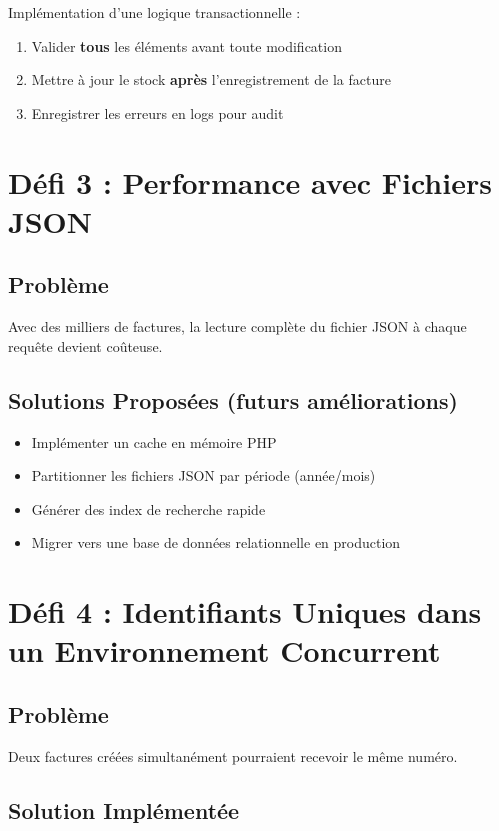 \documentclass[12pt,a4paper]{report}
\begin{document}
Implémentation d'une logique transactionnelle :

\begin{enumerate}
    \item Valider \textbf{tous} les éléments avant toute modification
    \item Mettre à jour le stock \textbf{après} l'enregistrement de la facture
    \item Enregistrer les erreurs en logs pour audit
\end{enumerate}

\section{Défi 3 : Performance avec Fichiers JSON}

\subsection{Problème}

Avec des milliers de factures, la lecture complète du fichier JSON à chaque requête devient coûteuse.

\subsection{Solutions Proposées (futurs améliorations)}

\begin{itemize}
    \item Implémenter un cache en mémoire PHP
    \item Partitionner les fichiers JSON par période (année/mois)
    \item Générer des index de recherche rapide
    \item Migrer vers une base de données relationnelle en production
\end{itemize}

\section{Défi 4 : Identifiants Uniques dans un Environnement Concurrent}

\subsection{Problème}

Deux factures créées simultanément pourraient recevoir le même numéro.

\subsection{Solution Implémentée}
\end{document}
